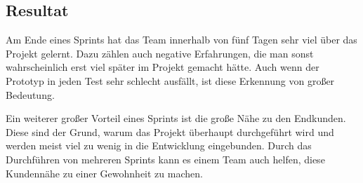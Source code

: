 \subsection*{Resultat}
Am Ende eines Sprints hat das Team innerhalb von fünf Tagen sehr viel über das Projekt gelernt. Dazu zählen auch negative Erfahrungen, die man sonst wahrscheinlich erst viel später im Projekt gemacht hätte. Auch wenn der Prototyp in jeden Test sehr schlecht ausfällt, ist diese Erkennung von großer Bedeutung. 

Ein weiterer großer Vorteil eines Sprints ist die große Nähe zu den Endkunden. Diese sind der Grund, warum das Projekt überhaupt durchgeführt wird und werden meist viel zu wenig in die Entwicklung eingebunden. Durch das Durchführen von mehreren Sprints kann es einem Team auch helfen, diese Kundennähe zu einer Gewohnheit zu machen.
